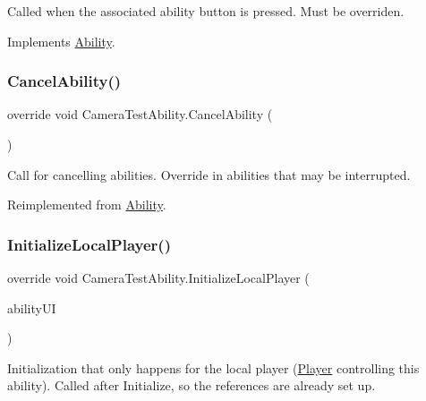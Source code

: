 Called when the associated ability button is pressed. Must be overriden. 



Implements \hyperlink{class_ability_a7722265862f8b29828315725415ce266}{Ability}.

\hypertarget{class_camera_test_ability_ac3a251d3757f6d45f96668631b26ff7d}{}\label{class_camera_test_ability_ac3a251d3757f6d45f96668631b26ff7d} 
\subsubsection{\texorpdfstring{Cancel\+Ability()}{CancelAbility()}}
{\footnotesize\ttfamily override void Camera\+Test\+Ability.\+Cancel\+Ability (\begin{DoxyParamCaption}{ }\end{DoxyParamCaption})\hspace{0.3cm}{\ttfamily [virtual]}}



Call for cancelling abilities. Override in abilities that may be interrupted. 



Reimplemented from \hyperlink{class_ability_ab0eaf1ad670e0624a5534c50b10c002f}{Ability}.

\hypertarget{class_camera_test_ability_ad60de19016609c34f802f6d7eff6b7c8}{}\label{class_camera_test_ability_ad60de19016609c34f802f6d7eff6b7c8} 
\subsubsection{\texorpdfstring{Initialize\+Local\+Player()}{InitializeLocalPlayer()}}
{\footnotesize\ttfamily override void Camera\+Test\+Ability.\+Initialize\+Local\+Player (\begin{DoxyParamCaption}\item[{\hyperlink{class_ability_u_i}{Ability\+UI}}]{ability\+UI }\end{DoxyParamCaption})\hspace{0.3cm}{\ttfamily [virtual]}}



Initialization that only happens for the local player (\hyperlink{class_player}{Player} controlling this ability). Called after Initialize, so the references are already set up. 



